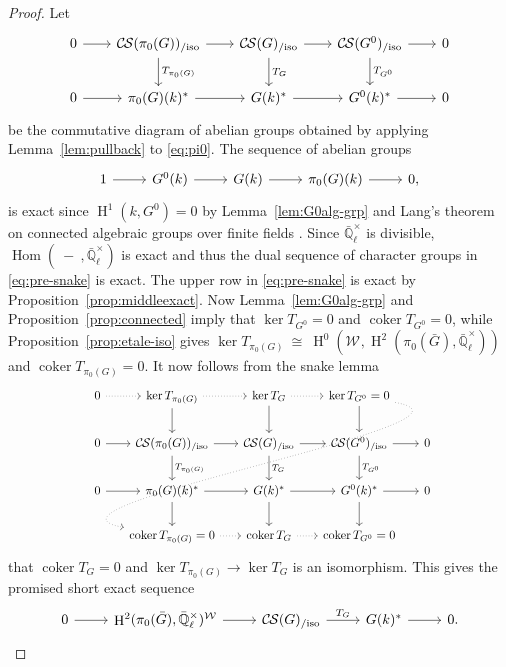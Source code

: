 \documentclass[10pt]{amsart}
\theoremstyle{plain}
\theoremstyle{definition}
\newcommand{\EE}{\mathbb{\bar Q}_\ell}
\newcommand{\Fq}{k}
\newcommand{\EEx}{\EE^\times}
\newcommand{\Weil}[1]{\mathcal{W}_{#1}}
\DeclareMathOperator{\Hom}{Hom}
\DeclareMathOperator{\coker}{coker}
\DeclareMathOperator{\Hh}{H}
\newcommand{\iso}{{\ \cong\ }}
\newcommand{\TrFrob}[1]{T_{#1}}
\newcommand{\CS}{{\mathcal{C\hskip-0.8pt S}}}
\newcommand{\CSiso}[1]{\CS(#1)_{/\text{iso}}}
\newcommand{\bG}{\bar{G}}
\begin{document}
\begin{proof}
  Let
  \begin{equation}\label{eq:pre-snake}
  \begin{tikzcd}[row sep=20, column sep=20]
    0 \rar & \CSiso{\pi_0(G)} \rar \dar{\TrFrob{\pi_0(G)}}
    & \CSiso{G} \rar \dar{\TrFrob{G}} & \CSiso{G^0} \rar \dar{\TrFrob{G^0}} & 0\\
    0 \rar & \pi_0(G)(\Fq)^* \rar
    &  G(\Fq)^* \rar & G^0(\Fq)^* \rar & 0
  \end{tikzcd}
  \end{equation}
  be the commutative diagram of abelian groups obtained by applying
  Lemma~\ref{lem:pullback} to \eqref{eq:pi0}.
  The sequence of abelian groups
\[
  \begin{tikzcd}
    1 \rar & G^0(\Fq) \rar & G(\Fq) \rar & \pi_0(G)(\Fq) \rar & 0,
  \end{tikzcd}
\]
  is exact since $\Hh^1(\Fq,G^0) =0$ by Lemma~\ref{lem:G0alg-grp} and Lang's theorem on connected algebraic groups over finite fields \cite{lang:56a}.
  Since $\EEx$ is divisible, $\Hom(\ - \ ,\EEx)$ is exact and thus the dual sequence of
  character groups in \eqref{eq:pre-snake} is exact.
%
  The upper row in \eqref{eq:pre-snake} is exact by Proposition~\ref{prop:middleexact}.
  Now Lemma~\ref{lem:G0alg-grp} and Proposition~\ref{prop:connected}
  imply that $\ker \TrFrob{G^0} =0$ and $\coker \TrFrob{G^0}=0$,
  while Proposition~\ref{prop:etale-iso} gives $\ker \TrFrob{\pi_0(G)} \iso \Hh^0(\Weil{},\Hh^2(\pi_0(\bG),\EEx))$
  and $\coker \TrFrob{\pi_0(G)}=0$.
It now follows from the snake lemma
 \begin{equation}\label{eq:snake}
  \begin{tikzcd}[row sep=20, column sep=15]
    0 \arrow[dotted]{r} & \ker \TrFrob{\pi_0(G)} \arrow[dotted]{r} \dar & \arrow{d} \ker \TrFrob{G} \arrow[dotted]{r} & \ker \TrFrob{G^0} =0 \arrow[dotted, out=-10, in=170]{dddll} \dar & \\
    0 \rar & \CSiso{\pi_0(G)} \rar \dar{\TrFrob{\pi_0(G)}}
    & \CSiso{G} \rar \dar{\TrFrob{G}} & \CSiso{G^0} \rar \dar{\TrFrob{G^0}} & 0\\
    0 \rar & \pi_0(G)(\Fq)^* \rar \dar
    & \arrow{d} G(\Fq)^* \rar & G^0(\Fq)^* \rar \dar & 0\\
   &  \coker \TrFrob{\pi_0(G)} =0 \arrow[dotted]{r} & \coker \TrFrob{G} \arrow[dotted]{r} & \coker \TrFrob{G^0} =0 & 
  \end{tikzcd}
  \end{equation}
that $\coker \TrFrob{G} =0$
and $\ker \TrFrob{\pi_0(G)} \to \ker \TrFrob{G}$ is an isomorphism.
This gives the promised short exact sequence
\[
  \begin{tikzcd}
0 \arrow{r} & \Hh^2(\pi_0(\bG),\EEx)^{\Weil{}} \arrow{r} & \CSiso{G} \arrow{r}{\TrFrob{G}} & G(\Fq)^* \arrow{r} & 0. 
  \end{tikzcd}
\]
\end{proof}
\end{document}
